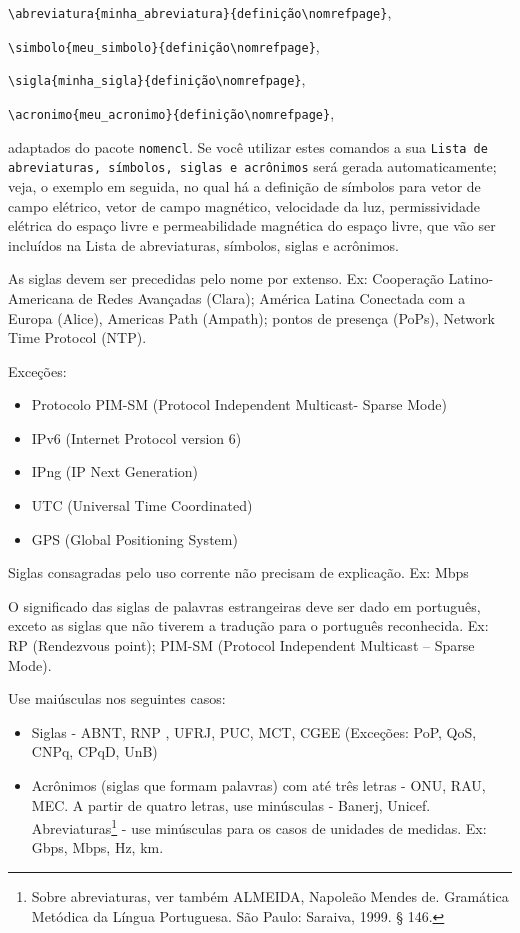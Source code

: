 \noindent\verb|\abreviatura{minha_abreviatura}{definição\nomrefpage}|,

\noindent\verb|\simbolo{meu_simbolo}{definição\nomrefpage}|,

\noindent\verb|\sigla{minha_sigla}{definição\nomrefpage}|,

\noindent\verb|\acronimo{meu_acronimo}{definição\nomrefpage}|,

\noindent adaptados do pacote \texttt{nomencl}. Se você utilizar estes comandos a sua \texttt{Lista de abreviaturas, símbolos, siglas e acrônimos} será gerada automaticamente; veja, o exemplo em seguida, no qual há a definição de símbolos para vetor de campo elétrico, vetor de campo magnético, velocidade da luz, permissividade elétrica do espaço livre e permeabilidade magnética do espaço livre, que vão ser incluídos na Lista de abreviaturas, símbolos, siglas e acrônimos.

As siglas devem ser precedidas pelo nome por extenso. Ex: Cooperação Latino-Americana de Redes Avançadas (Clara); América Latina Conectada com a Europa (Alice), Americas Path (Ampath); pontos de presença (PoPs), Network Time Protocol (NTP).

Exceções:
\begin{itemize}
\item Protocolo PIM-SM (Protocol Independent Multicast- Sparse Mode)
\item IPv6 (Internet Protocol version 6)
\item IPng (IP Next Generation)
\item UTC (Universal Time Coordinated)
\item GPS (Global Positioning System)
\end{itemize}

Siglas consagradas pelo uso corrente não precisam de explicação. Ex: Mbps

O significado das siglas de palavras estrangeiras deve ser dado em português, exceto as siglas que não tiverem a tradução para o português reconhecida. Ex: RP (Rendezvous point); PIM-SM (Protocol Independent Multicast – Sparse Mode).

Use maiúsculas nos seguintes casos:

\begin{itemize}
\item Siglas - ABNT, RNP , UFRJ, PUC, MCT, CGEE (Exceções: PoP, QoS, CNPq, CPqD, UnB)
\item Acrônimos (siglas que formam palavras) com até três letras - ONU, RAU, MEC. A partir de quatro letras, use minúsculas - Banerj, Unicef.
Abreviaturas\footnote[1]{Sobre abreviaturas, ver também ALMEIDA, Napoleão Mendes de. Gramática Metódica da Língua Portuguesa. São Paulo: Saraiva, 1999. § 146.}
 - use minúsculas para os casos de unidades de medidas. Ex: Gbps, Mbps, Hz, km.
\end{itemize}

